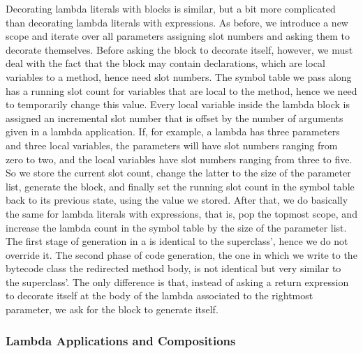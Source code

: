 Decorating lambda literals with blocks is similar, but a bit more complicated than decorating lambda literals with expressions. As before, we introduce a new scope and iterate over all parameters assigning slot numbers and asking them to decorate themselves. Before asking the block to decorate itself, however, we must deal with the fact that the block may contain declarations, which are local variables to a method, hence need slot numbers. The symbol table we pass along has a running slot count for variables that are local to the  method, hence we need to temporarily change this value. Every local variable inside the lambda block is assigned an incremental slot number that is offset by the number of arguments given in a lambda application. If, for example, a lambda has three parameters and three local variables, the parameters will have slot numbers ranging from zero to two, and the local variables have slot numbers ranging from three to five. So we store the current slot count, change the latter to the size of the parameter list, generate the block, and finally set the running slot count in the symbol table back to its previous state, using the value we stored. After that, we do basically the same for lambda literals with expressions, that is, pop the topmost scope, and increase the lambda count in the symbol table by the size of the parameter list. The first stage of generation in a  is identical to the superclass', hence we do not override it. The second phase of code generation, the one in which we write to the bytecode class the redirected method body, is not identical but very similar to the superclass'. The only difference is that, instead of asking a return expression to decorate itself at the body of the lambda associated to the rightmost parameter, we ask for the block to generate itself.

\subsubsection{Lambda Applications and Compositions}


